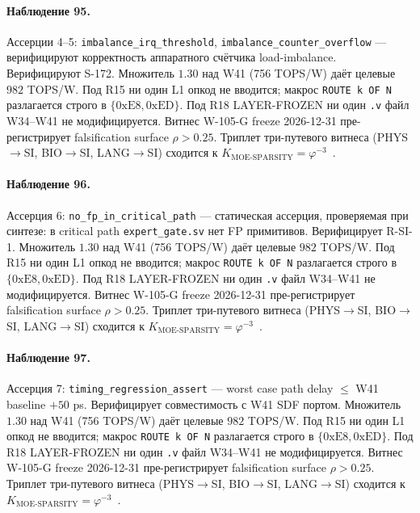 \paragraph{Наблюдение 95.} Ассерции 4--5: \texttt{imbalance\_irq\_threshold}, \texttt{imbalance\_counter\_overflow} --- верифицируют корректность аппаратного счётчика load-imbalance. Верифицируют S-172. Множитель $1{.}30$ над W41 (756 TOPS/W) даёт целевые $982$ TOPS/W. Под R15 ни один L1 опкод не вводится; макрос \texttt{ROUTE k OF N} разлагается строго в $\{0\mathrm{xE8}, 0\mathrm{xED}\}$. Под R18 LAYER-FROZEN ни один \texttt{.v} файл W34--W41 не модифицируется. Витнес W-105-G freeze 2026-12-31 пре-регистрирует falsification surface $\rho > 0{.}25$. Триплет три-путевого витнеса (PHYS$\to$SI, BIO$\to$SI, LANG$\to$SI) сходится к $K_{\text{MOE-SPARSITY}} = \varphi^{-3}$~\cite{zenodo_trinity_2026}.

\paragraph{Наблюдение 96.} Ассерция 6: \texttt{no\_fp\_in\_critical\_path} --- статическая ассерция, проверяемая при синтезе: в critical path \texttt{expert\_gate.sv} нет FP примитивов. Верифицирует R-SI-1. Множитель $1{.}30$ над W41 (756 TOPS/W) даёт целевые $982$ TOPS/W. Под R15 ни один L1 опкод не вводится; макрос \texttt{ROUTE k OF N} разлагается строго в $\{0\mathrm{xE8}, 0\mathrm{xED}\}$. Под R18 LAYER-FROZEN ни один \texttt{.v} файл W34--W41 не модифицируется. Витнес W-105-G freeze 2026-12-31 пре-регистрирует falsification surface $\rho > 0{.}25$. Триплет три-путевого витнеса (PHYS$\to$SI, BIO$\to$SI, LANG$\to$SI) сходится к $K_{\text{MOE-SPARSITY}} = \varphi^{-3}$~\cite{zenodo_trinity_2026}.

\paragraph{Наблюдение 97.} Ассерция 7: \texttt{timing\_regression\_assert} --- worst case path delay $\leq$ W41 baseline $+ 50$ ps. Верифицирует совместимость с W41 SDF портом. Множитель $1{.}30$ над W41 (756 TOPS/W) даёт целевые $982$ TOPS/W. Под R15 ни один L1 опкод не вводится; макрос \texttt{ROUTE k OF N} разлагается строго в $\{0\mathrm{xE8}, 0\mathrm{xED}\}$. Под R18 LAYER-FROZEN ни один \texttt{.v} файл W34--W41 не модифицируется. Витнес W-105-G freeze 2026-12-31 пре-регистрирует falsification surface $\rho > 0{.}25$. Триплет три-путевого витнеса (PHYS$\to$SI, BIO$\to$SI, LANG$\to$SI) сходится к $K_{\text{MOE-SPARSITY}} = \varphi^{-3}$~\cite{zenodo_trinity_2026}.

